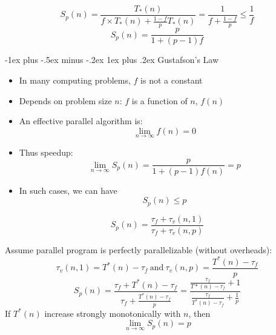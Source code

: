 \documentclass[8pt,landscape]{article}
\makeatletter
\renewcommand{\subsubsection}{\@startsection{subsubsection}{3}{0mm}%
                                {-1ex plus -.5ex minus -.2ex}%
                                {1ex plus .2ex}%
                                {\normalfont\small\bfseries}}
\makeatother
\begin{document}
\begin{multicols}{4}
\begin{equation}
S_{p}(n) = \frac{T_{*}(n)}{f \times T_{*}(n) + \frac{1-f}{p}T_{*}(n)} = \frac{1}{f + \frac{1-f}{p}} \leq \frac{1}{f}
\end{equation}
\begin{equation}
S_{p}(n) = \frac{p}{1 + (p-1) f}
\end{equation}

\subsubsection{Gustafson's Law}
\begin{itemize}
	\item In many computing problems, $f$ is not a constant
	\item Depends on problem size $n$: $f$ is a function of $n$, $f(n)$
	\item An effective parallel algorithm is: \begin{equation}
		\lim_{n\rightarrow\infty} f(n) = 0
	\end{equation}
	\item Thus speedup: \begin{equation}
		\lim_{n\rightarrow\infty} S_{p}(n) = \frac{p}{1 + (p-1)f(n)} = p
	\end{equation}
	\item In such cases, we can have \begin{equation}
		S_{p}(n) \leq p
	\end{equation}
\end{itemize}

\begin{equation}
S_{p}(n) = \frac{\tau_{f} + \tau_{v}(n, 1)}{\tau_{f} + \tau_{v}(n, p)}
\end{equation}

Assume parallel program is perfectly parallelizable (without overheads):
\begin{equation}
\tau_{v}(n, 1) = T^{*}(n) - \tau_{f} \  \textrm{and} \ \tau_{v}(n, p) = \frac{T^{*}(n) - \tau_{f}}{p}
\end{equation}
\begin{equation}
S_{p}(n) = \frac{\tau_{f} + T^{*}(n) - \tau_{f}}{\tau_{f} + \frac{T^{*}(n) - \tau_{f}}{p}} = \frac{\frac{\tau_{f}}{T*(n) - \tau_{f}} + 1}{\frac{\tau_{f}}{T^{*}(n) - \tau_{f}} + \frac{1}{p}}
\end{equation}
If $T^*(n)$ increase strongly monotonically with $n$, then \begin{equation}
\lim_{n\rightarrow\infty} S_{p}(n) = p
\end{equation}


\end{multicols}
\end{document}
